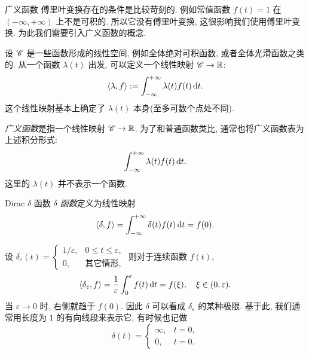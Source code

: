 \begin{frame}{广义函数}
\onslide<+->
傅里叶变换存在的条件是比较苛刻的.
\onslide<+->
例如常值函数 $f(t)=1$ 在 $(-\infty,+\infty)$ 上不是可积的. 所以它没有傅里叶变换, 这很影响我们使用傅里叶变换.
\onslide<+->
为此我们需要引入广义函数的概念.

\onslide<+->
设 $\mathscr{C}$ 是一些函数形成的线性空间, 例如全体绝对可积函数, 或者全体光滑函数之类的. 
\onslide<+->
从一个函数 $\lambda(t)$ 出发, 可以定义一个线性映射 $\mathscr{C}\to {\mathbb{R}}$:
\[\langle{\lambda,f}\rangle:=\int_{-\infty}^{+\infty}\lambda(t)f(t)\,\mathrm{d} t.\]
\onslide<+->
这个线性映射基本上确定了 $\lambda(t)$ 本身(至多可数个点处不同).

\onslide<+->
\emph{广义函数}是指一个线性映射 $\mathscr{C}\to {\mathbb{R}}$.
\onslide<+->
为了和普通函数类比, 通常也将广义函数表为上述积分形式:
\[\int_{-\infty}^{+\infty}\lambda(t)f(t)\,\mathrm{d} t.\]
这里的 $\lambda(t)$ 并不表示一个函数.
\end{frame}


\begin{frame}{Dirac $\delta$ 函数}
\onslide<+->
\emph{$\delta$ 函数}定义为线性映射
\[\langle{\delta,f}\rangle=\int_{-\infty}^{+\infty}\delta(t)f(t)\,\mathrm{d} t=f(0).\]
\onslide<+->
设 $\delta_\varepsilon(t)=\begin{cases}
1/\varepsilon,&0\le t\le \varepsilon,\\
0,&\text{其它情形,}
\end{cases}$
\onslide<+->
则对于连续函数 $f(t)$,
\[\langle{\delta_\varepsilon,f}\rangle=\frac1\varepsilon\int_0^\varepsilon f(t)\,\mathrm{d} t=f(\xi),\quad \xi\in(0,\varepsilon).\]
\onslide<+->
当 $\varepsilon\to0$ 时, 右侧就趋于 $f(0)$.
\onslide<+->
因此 $\delta$ 可以看成 $\delta_\varepsilon$ 的某种极限.
\onslide<+->
基于此, 我们通常用长度为 $1$ 的有向线段来表示它, 有时候也记做
\[\delta(t)=\begin{cases}
\infty,&t=0,\\
0,&t=0.
\end{cases}\]
\end{frame}



